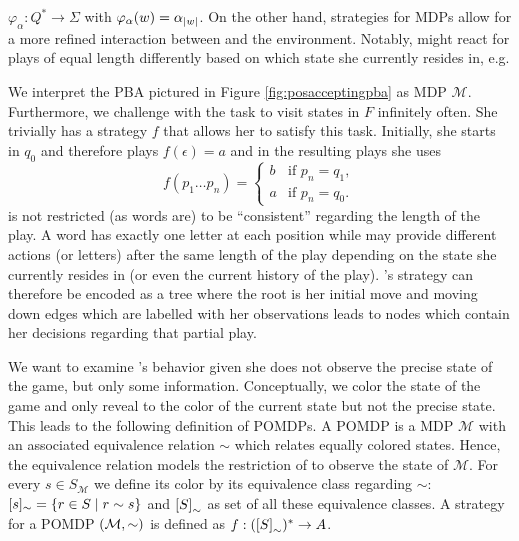 $\varphi_{\alpha}:Q^{*}\rightarrow\Sigma$ with
$\varphi_{\alpha}(w) = \alpha_{\left\vert{w}\right\vert}$. On the other hand, strategies for
\acp{MDP} allow for a more refined interaction between \eve{} and the
environment. Notably, \eve{} might react for plays of equal length differently
based on which state she currently resides in, e.g.
\begin{example}
  We interpret the \ac{PBA} pictured in Figure \ref{fig:posacceptingpba} as
  \ac{MDP} $\mathcal{M}$. Furthermore, we challenge \eve{} with the task to
  visit states in $F$ infinitely often. She trivially has a strategy $f$
  that allows her to satisfy this task. Initially, she starts in $q_{0}$ and 
  therefore plays $f(\epsilon) = a$ and in the resulting plays she uses
  \begin{equation*}
    f(p_{1}\dots p_{n}) = \begin{cases}
      b&\text{if }p_{n} = q_{1},\\
      a&\text{if }p_{n} = q_{0}.
    \end{cases}
  \end{equation*}
  \eve{} is not restricted (as words are) to be \enquote{consistent} 
  regarding the length of the play. A word has exactly one letter at each 
  position while \eve{} may provide different actions (or letters) after
  the same length of the play depending on the state she currently resides in
  (or even the current history of the play). \eve{}'s strategy can therefore be
  encoded as a tree where the root is her initial move and moving down edges 
  which are labelled with her observations leads to nodes which contain her 
  decisions regarding that partial play.
  \label{ex:pbaasmdp}
\end{example}
We want to examine \eve{}'s behavior given she does not observe the precise 
state of the game, but only some information. Conceptually, we color the state
of the game and only reveal to \eve{} the color of the current state but not 
the precise state. This leads to the following definition of \acp{POMDP}. A 
\ac{POMDP} is a \ac{MDP} $\mathcal{M}$ with an associated equivalence relation 
$\sim$ which relates equally colored states. Hence, the equivalence relation 
models the restriction of \eve{} to observe the state of $\mathcal{M}$. For 
every $s\in S_{\mathcal{M}}$ we define its color by its equivalence class 
regarding $\sim$: $[s]_{\sim} = \left\{r\in S\mid r \sim s\right\}$ and
$\left[S\right]_{\sim}$ as set of all these equivalence classes. A
strategy for a \ac{POMDP} $\left(\mathcal{M}, \sim\right)$ is defined as
$f:(\left[S\right]_{\sim})^{*}\rightarrow A$.
